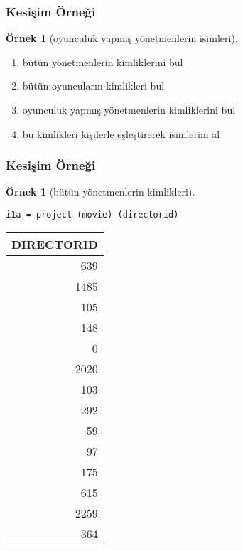 \documentclass[dvipsnames]{beamer}
\theoremstyle{definition}
\theoremstyle{example}
\newtheorem{ornek}[theorem]{Örnek}
\theoremstyle{plain}
\begin{document}
\begin{frame}
  \frametitle{Kesişim Örneği}

  \begin{ornek}[oyunculuk yapmış yönetmenlerin isimleri]
    \pause
    \begin{enumerate}
      \item bütün yönetmenlerin kimliklerini bul

      \pause
      \item bütün oyuncuların kimlikleri bul

      \pause
      \item oyunculuk yapmış yönetmenlerin kimliklerini bul

      \pause
      \item bu kimlikleri kişilerle eşleştirerek isimlerini al
    \end{enumerate}
  \end{ornek}
\end{frame}

\begin{frame}[fragile]
  \frametitle{Kesişim Örneği}

  \begin{ornek}[bütün yönetmenlerin kimlikleri]
    \begin{lstlisting}
i1a = project (movie) (directorid)
    \end{lstlisting}

    \pause
    \begin{tiny}
    \begin{table}
      \begin{tabular}{|r|}\hline
DIRECTORID\\\hline\hline
       639\\\hline
      1485\\\hline
       105\\\hline
       148\\\hline
         0\\\hline
      2020\\\hline
       103\\\hline
       292\\\hline
        59\\\hline
        97\\\hline
       175\\\hline
       615\\\hline
      2259\\\hline
       364\\\hline
      \end{tabular}
    \end{table}
    \end{tiny}
  \end{ornek}
\end{frame}
\end{document}
